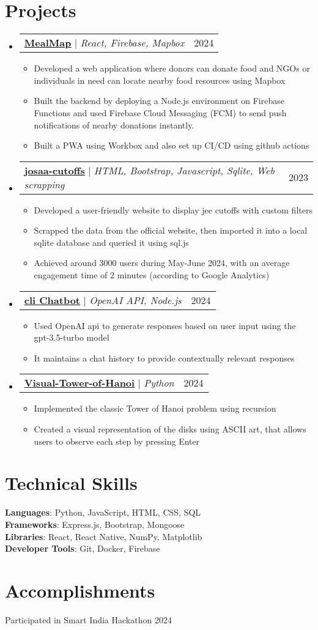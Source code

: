 \documentclass[letterpaper,11pt]{article}
\makeatletter
\newcommand{\resumeItem}[1]{
\item\small{
{#1 \vspace{-2pt}}
}
}
\newcommand{\resumeProjectHeading}[2]{
\item
\begin{tabular*}{0.97\textwidth}{l@{\extracolsep{\fill}}r}
\small#1 & #2 \\
\end{tabular*}\vspace{-7pt}
}
\newcommand{\resumeSubHeadingListStart}{\begin{itemize}[leftmargin=0.15in, label={}]}
\newcommand{\resumeSubHeadingListEnd}{\end{itemize}}
\newcommand{\resumeItemListStart}{\begin{itemize}}
\newcommand{\resumeItemListEnd}{\end{itemize}\vspace{-5pt}}
\makeatother
\begin{document}
\section{Projects}
\resumeSubHeadingListStart
\resumeProjectHeading
{\textbf{\href{https://github.com/Sbrjt/MealMap}{\href{}{\underline{MealMap}}}} $|$ \emph{React, Firebase, Mapbox}}{2024}
\resumeItemListStart
\resumeItem{Developed a web application where donors can donate food and NGOs or individuals in need can locate nearby food resources using Mapbox}
\resumeItem{Built the backend by deploying a Node.js environment on Firebase Functions and used Firebase Cloud Messaging (FCM) to send push notifications of nearby donations instantly.}
\resumeItem{Built a PWA using Workbox and also set up CI/CD using github actions}
\resumeItemListEnd
\resumeProjectHeading
{\textbf{\href{https://github.com/Sbrjt/josaa-cutoffs}{\href{}{\underline{josaa-cutoffs}}}} $|$ \emph{HTML, Bootstrap, Javascript, Sqlite, Web scrapping}}{2023}
\resumeItemListStart
\resumeItem{Developed a user-friendly website to display jee cutoffs with custom filters}
\resumeItem{Scrapped the data from the official website, then imported it into a local sqlite database and queried it using sql.js}
\resumeItem{Achieved around 3000 users during May-June 2024, with an average engagement time of 2 minutes (according to Google Analytics)}
\resumeItemListEnd
\resumeProjectHeading
{\textbf{\href{https://github.com/Sbrjt/Chatbot}{\href{}{\underline{cli Chatbot}}}} $|$ \emph{OpenAI API, Node.js}}{2024}
\resumeItemListStart
\resumeItem{Used OpenAI api to generate responses based on user input using the gpt-3.5-turbo model}
\resumeItem{It maintains a chat history to provide contextually relevant responses}
\resumeItemListEnd
\resumeProjectHeading
{\textbf{\href{https://github.com/Sbrjt/Visual-Tower-of-Hanoi}{\href{}{\underline{Visual-Tower-of-Hanoi}}}} $|$ \emph{Python}}{2024}
\resumeItemListStart
\resumeItem{Implemented the classic Tower of Hanoi problem using recursion}
\resumeItem{Created a visual representation of the disks using ASCII art, that allows users to observe each step by pressing Enter}
\resumeItemListEnd
\resumeSubHeadingListEnd



%
\section{Technical Skills}
\begin{itemize}[leftmargin=0.15in, label={}]
\small{\item{
\textbf{Languages}{: Python, JavaScript, HTML, CSS, SQL} \\
\textbf{Frameworks}{: Express.js, Bootstrap, Mongoose} \\
\textbf{Libraries}{: React, React Native, NumPy, Matplotlib} \\
\textbf{Developer Tools}{: Git, Docker, Firebase }
}}
\end{itemize}


\section{Accomplishments}
\begin{itemize}[leftmargin=0.15in, label={}]
\small{\item{
{Participated in Smart India Hackathon 2024} \\
}}
\end{itemize}


\end{document}
